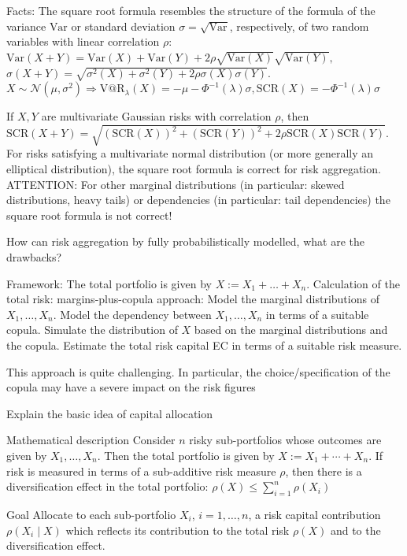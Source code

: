 {Facts:
 The square root formula resembles the structure of the formula of the variance \(\text{Var}\) or standard deviation \(\sigma = \sqrt{\text{Var}}\), respectively, of two random variables with linear correlation \(\rho\):
\(
\text{Var}(X + Y) = \text{Var}(X) + \text{Var}(Y) + 2\rho \sqrt{\text{Var}(X)} \sqrt{\text{Var}(Y)},
\)
\(
\sigma(X + Y) = \sqrt{\sigma^2(X) + \sigma^2(Y) + 2\rho \sigma(X)\sigma(Y)}.
\)
\(X \sim \mathcal{N}(\mu, \sigma^2) \Rightarrow \text{V@R}_\lambda(X) = -\mu - \Phi^{-1}(\lambda)\sigma, \text{SCR}(X) = -\Phi^{-1}(\lambda)\sigma\)

 If \(X, Y\) are multivariate Gaussian risks with correlation \(\rho\), then
\(
\text{SCR}(X + Y) = \sqrt{(\text{SCR}(X))^2 + (\text{SCR}(Y))^2 + 2\rho\text{SCR}(X)\text{SCR}(Y)}.
\)
For risks satisfying a multivariate normal distribution (or more generally an elliptical distribution), the square root formula is correct for risk aggregation.
ATTENTION:
For other marginal distributions (in particular: skewed distributions, heavy tails) or dependencies 
(in particular: tail dependencies) the square root formula is not correct!


How can risk aggregation by fully probabilistically modelled, what are the drawbacks?

Framework: The total portfolio is given by \(X := X_1 + \ldots + X_n\).
Calculation of the total risk: margins-plus-copula approach:
Model the marginal distributions of \(X_1, \ldots, X_n\).
Model the dependency between \(X_1, \ldots, X_n\) in terms of a suitable copula. 
Simulate the distribution of \(X\) based on the marginal distributions and the copula.
Estimate the total risk capital EC in terms of a suitable risk measure.

This approach is quite challenging. In particular, the choice/specification of the copula may have a severe impact on the risk figures

Explain the basic idea of capital allocation

Mathematical description
Consider \(n\) risky sub-portfolios whose outcomes are given by \(X_1, \ldots, X_n\).
Then the total portfolio is given by \(X := X_1 + \cdots + X_n\).
If risk is measured in terms of a sub-additive risk measure \(\rho\), then there is a diversification effect in the total portfolio:
\(
\rho(X) \leq \sum_{i=1}^n \rho(X_i)
\)

Goal
Allocate to each sub-portfolio \(X_i\), \(i = 1, \ldots, n\), a risk capital contribution \(\rho(X_i \mid X)\) which reflects its contribution 
to the total risk \(\rho(X)\) and to the diversification effect.

}
